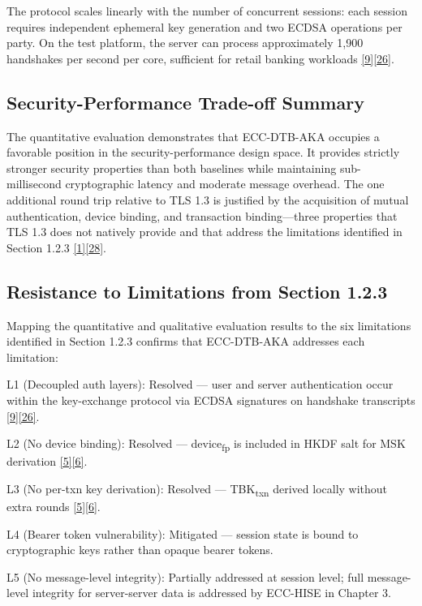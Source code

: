 \indent The protocol scales linearly with the number of concurrent sessions: each session requires independent ephemeral key generation and two ECDSA operations per party. On the test platform, the server can process approximately 1,900 handshakes per second per core, sufficient for retail banking workloads \hyperref[ref:9]{[9]}\hyperref[ref:26]{[26]}.

\subsection{Security-Performance Trade-off Summary}

\indent The quantitative evaluation demonstrates that ECC-DTB-AKA occupies a favorable position in the security-performance design space. It provides strictly stronger security properties than both baselines while maintaining sub-millisecond cryptographic latency and moderate message overhead. The one additional round trip relative to TLS 1.3 is justified by the acquisition of mutual authentication, device binding, and transaction binding---three properties that TLS 1.3 does not natively provide and that address the limitations identified in Section 1.2.3 \hyperref[ref:1]{[1]}\hyperref[ref:28]{[28]}.

\subsection{Resistance to Limitations from Section 1.2.3}

\indent Mapping the quantitative and qualitative evaluation results to the six limitations identified in Section 1.2.3 confirms that ECC-DTB-AKA addresses each limitation:

\indent L1 (Decoupled auth layers): Resolved --- user and server authentication occur within the key-exchange protocol via ECDSA signatures on handshake transcripts \hyperref[ref:9]{[9]}\hyperref[ref:26]{[26]}.

\indent L2 (No device binding): Resolved --- device\textsubscript{fp} is included in HKDF salt for MSK derivation \hyperref[ref:5]{[5]}\hyperref[ref:6]{[6]}.

\indent L3 (No per-txn key derivation): Resolved --- TBK\textsubscript{txn} derived locally without extra rounds \hyperref[ref:5]{[5]}\hyperref[ref:6]{[6]}.

\indent L4 (Bearer token vulnerability): Mitigated --- session state is bound to cryptographic keys rather than opaque bearer tokens.

\indent L5 (No message-level integrity): Partially addressed at session level; full message-level integrity for server-server data is addressed by ECC-HISE in Chapter 3.

